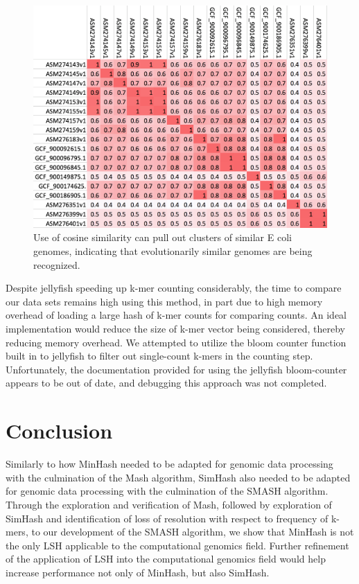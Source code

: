 \documentclass[12pt, letterpaper]{article}
\begin{document}
\begin{figure}[h]
	\centering
	\includegraphics[width=1.0\textwidth]{smashtable.png}
	\caption{Use of cosine similarity can pull out clusters of similar E coli genomes, indicating that evolutionarily similar genomes are being recognized.}
	\label{fig:Cosine Clusters}
\end{figure}
\FloatBarrier
Despite jellyfish speeding up k-mer counting considerably, the time to compare our data sets remains high using this method, in part due to high memory overhead of loading a large hash of k-mer counts for comparing counts. An ideal implementation would reduce the size of k-mer vector being considered, thereby reducing memory overhead. We attempted to utilize the bloom counter function built in to jellyfish to filter out single-count k-mers in the counting step. Unfortunately, the documentation provided for using the jellyfish bloom-counter appears to be out of date, and debugging this approach was not completed.

\section{Conclusion}
Similarly to how MinHash needed to be adapted for genomic data processing with the culmination of the Mash algorithm, SimHash also needed to be adapted for genomic data processing with the culmination of the SMASH algorithm. Through the exploration and verification of Mash, followed by exploration of SimHash and identification of loss of resolution with respect to frequency of k-mers, to our development of the SMASH algorithm, we show that MinHash is not the only LSH applicable to the computational genomics field. Further refinement of the application of LSH into the computational genomics field would help increase performance not only of MinHash, but also SimHash.
\end{document}
